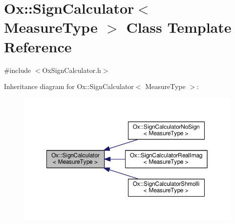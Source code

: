 \hypertarget{class_ox_1_1_sign_calculator}{}\section{Ox\+:\+:Sign\+Calculator$<$ Measure\+Type $>$ Class Template Reference}
\label{class_ox_1_1_sign_calculator}


{\ttfamily \#include $<$Ox\+Sign\+Calculator.\+h$>$}



Inheritance diagram for Ox\+:\+:Sign\+Calculator$<$ Measure\+Type $>$\+:
\nopagebreak
\begin{figure}[H]
\begin{center}
\leavevmode
\includegraphics[width=350pt]{class_ox_1_1_sign_calculator__inherit__graph}
\end{center}
\end{figure}
